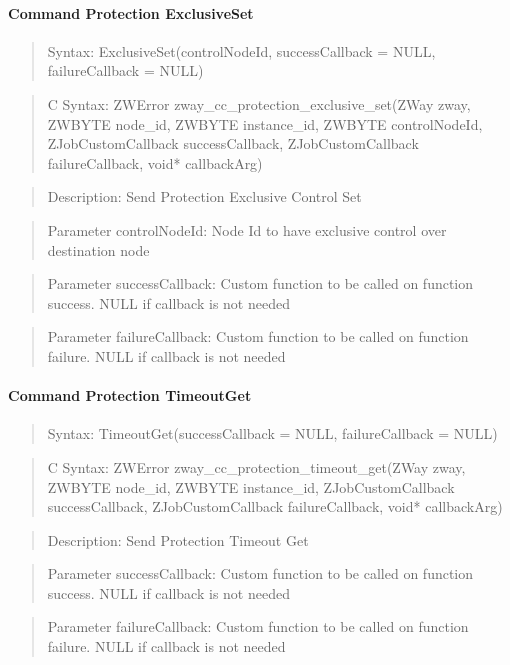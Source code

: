 \paragraph{Command Protection ExclusiveSet}
\begin{quote}Syntax: ExclusiveSet(controlNodeId, successCallback = NULL, failureCallback = NULL)\end{quote}
\begin{quote}C Syntax: ZWError zway\_cc\_protection\_exclusive\_set(ZWay zway, ZWBYTE node\_id, ZWBYTE instance\_id, ZWBYTE controlNodeId, ZJobCustomCallback successCallback, ZJobCustomCallback failureCallback, void* callbackArg)\end{quote}
\begin{quote}Description: Send Protection Exclusive Control Set\end{quote}
\begin{quote}Parameter controlNodeId: Node Id to have exclusive control over destination node\end{quote}
\begin{quote}Parameter successCallback: Custom function to be called on function success. NULL if callback is not needed\end{quote}
\begin{quote}Parameter failureCallback: Custom function to be called on function failure. NULL if callback is not needed\end{quote}


\paragraph{Command Protection TimeoutGet}
\begin{quote}Syntax: TimeoutGet(successCallback = NULL, failureCallback = NULL)\end{quote}
\begin{quote}C Syntax: ZWError zway\_cc\_protection\_timeout\_get(ZWay zway, ZWBYTE node\_id, ZWBYTE instance\_id, ZJobCustomCallback successCallback, ZJobCustomCallback failureCallback, void* callbackArg)\end{quote}
\begin{quote}Description: Send Protection Timeout Get\end{quote}
\begin{quote}Parameter successCallback: Custom function to be called on function success. NULL if callback is not needed\end{quote}
\begin{quote}Parameter failureCallback: Custom function to be called on function failure. NULL if callback is not needed\end{quote}


